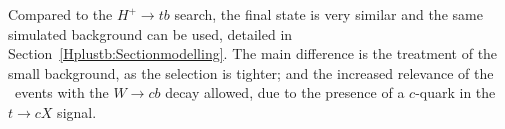 Compared to the $H^+\to tb$ search, the final state is very similar and the same simulated background can be used, detailed in Section~\ref{Hplustb:Sectionmodelling}. The main difference is the treatment of the small background, as the selection is tighter; and the increased relevance of the \ttbar\ events with the $W\to cb$ decay allowed, due to the presence of a $c$-quark in the $t\to cX$ signal.\\


